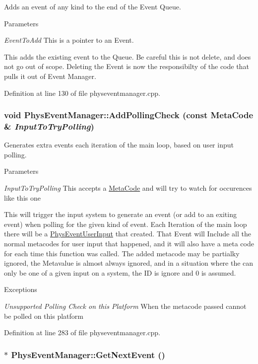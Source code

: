 Adds an event of any kind to the end of the Event Queue. 
\begin{DoxyParams}{Parameters}
\item[{\em EventToAdd}]This is a pointer to an Event.\end{DoxyParams}
This adds the existing event to the Queue. Be careful this is not delete, and does not go out of scope. Deleting the Event is now the responsibilty of the code that pulls it out of Event Manager. 

Definition at line 130 of file physeventmanager.cpp.\hypertarget{classPhysEventManager_a1e99385441c5377a741561db581ef3ae}{
\subsubsection[{AddPollingCheck}]{\setlength{\rightskip}{0pt plus 5cm}void PhysEventManager::AddPollingCheck (const {\bf MetaCode} \& {\em InputToTryPolling})}}
\label{d5/dd7/classPhysEventManager_a1e99385441c5377a741561db581ef3ae}


Generates extra events each iteration of the main loop, based on user input polling. 
\begin{DoxyParams}{Parameters}
\item[{\em InputToTryPolling}]This accepts a \hyperlink{classMetaCode}{MetaCode} and will try to watch for occurences like this one\end{DoxyParams}
This will trigger the input system to generate an event (or add to an exiting event) when polling for the given kind of event. Each Iteration of the main loop there will be a \hyperlink{classPhysEventUserInput}{PhysEventUserInput} that created. That Event will Include all the normal metacodes for user input that happened, and it will also have a meta code for each time this function was called. The added metacode may be partialky ignored, the Metavalue is almost always ignored, and in a situation where the can only be one of a given input on a system, the ID is ignore and 0 is assumed. 
\begin{DoxyExceptions}{Exceptions}
\item[{\em Unsupported Polling Check on this Platform}]When the metacode passed cannot be polled on this platform \end{DoxyExceptions}


Definition at line 283 of file physeventmanager.cpp.\hypertarget{classPhysEventManager_a6de94bc6c23dcbd7e15785cadee2e80b}{
\subsubsection[{GetNextEvent}]{ $\ast$ PhysEventManager::GetNextEvent ()}}
\label{d5/dd7/classPhysEventManager_a6de94bc6c23dcbd7e15785cadee2e80b}


